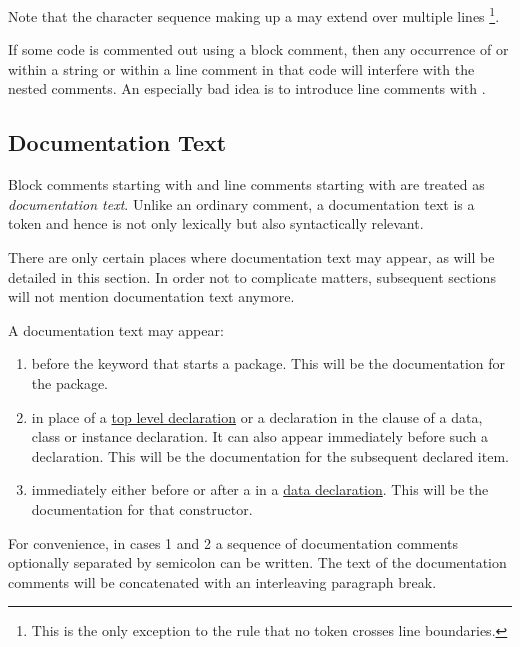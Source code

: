 Note that the character sequence making up a  may extend over multiple lines
\footnote{This is the only exception to the rule that no token crosses line
boundaries.}.

If some code is commented out using a block comment, then any occurrence of \regex{/*} or \regex{*/} within a string or
within a line comment in that code will interfere with the nested comments. An especially bad idea is to introduce line comments with \regex{//*}. 


\subsection{Documentation Text} \label{doccomment} 

Block comments starting with \regex{/**} and line comments starting with  \regex{///} are treated as \textit{documentation text}.
Unlike an ordinary comment, a documentation text is a token and hence is not only lexically but also syntactically relevant.

There are only certain places where documentation text may appear, as will be detailed in this section. 
In order not to complicate matters, subsequent sections will not mention documentation text anymore.

A documentation text may appear:
\begin{enumerate}
\item before the  keyword that starts a package. This will be the documentation for the package.
\item in place of a \hyperref[declarations]{top level declaration} or a declaration in the  clause of a data, class or instance declaration. It can also appear immediately before such a declaration.
This will be the documentation for the subsequent declared item. 
\item immediately either before or after a  in a \hyperref[algdcl]{data declaration}. This will be the documentation for that constructor.
\end{enumerate}

For convenience, in cases 1 and 2 a sequence of documentation comments optionally separated by semicolon can be written.
The text of the documentation comments will be concatenated with an interleaving paragraph break.

